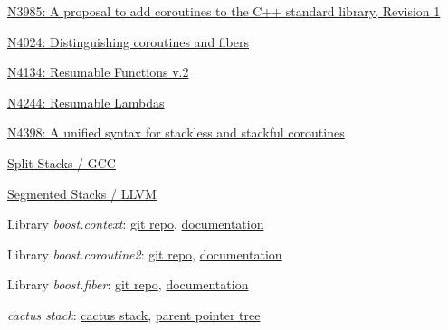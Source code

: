 \begin{thebibliography}{99}

        \href{http://www.open-std.org/jtc1/sc22/wg21/docs/papers/2014/n3985.pdf}
        {N3985: A proposal to add coroutines to the C++ standard library, Revision 1}

        \href{http://www.open-std.org/jtc1/sc22/wg21/docs/papers/2014/n4024.pdf}
        {N4024: Distinguishing coroutines and fibers}

        \href{http://www.open-std.org/jtc1/sc22/wg21/docs/papers/2014/n4134.pdf}
        {N4134: Resumable Functions v.2}

        \href{http://www.open-std.org/jtc1/sc22/wg21/docs/papers/2014/n4244.pdf}
        {N4244: Resumable Lambdas}

        \href{http://www.open-std.org/jtc1/sc22/wg21/docs/papers/2015/n4398.pdf}
        {N4398: A unified syntax for stackless and stackful coroutines}

        \href{http://gcc.gnu.org/wiki/SplitStacks}
        {Split Stacks / GCC}

        \href{http://llvm.org/releases/3.0/docs/SegmentedStacks.html}
        {Segmented Stacks / LLVM}

        Library \emph{boost.context}:
        \href{https://github.com/boostorg/context} {git repo},
        \href{http://www.boost.org/doc/libs/1_58_0/libs/context/doc/html/index.html} {documentation}

        Library \emph{boost.coroutine2}:
        \href{https://github.com/boostorg/coroutine2} {git repo},
        \href{http://olk.github.io/libs/coroutine2/doc/html/index.html} {documentation}

        Library \emph{boost.fiber}:
        \href{https://github.com/olk/boost-fiber} {git repo},
        \href{http://olk.github.io/libs/fiber/doc/html/index.html} {documentation}

        \emph{cactus stack}:
        \href{http://c2.com/cgi/wiki?CactusStack} {cactus stack},
        \href{http://en.wikipedia.org/wiki/Parent_pointer_tree} {parent pointer tree}

\end{thebibliography}
